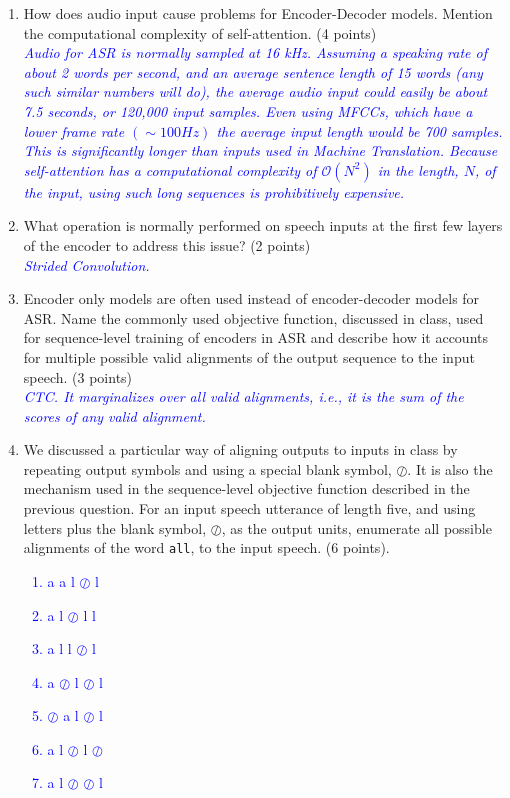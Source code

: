 \documentclass[12pt]{article}
\newcommand{\solution}[2]{\textcolor{blue}{\em #1}} %
\begin{document}
\begin{enumerate}

\item How does audio input cause problems for Encoder-Decoder models. Mention the computational complexity of self-attention.   \hfill (4 points)\\
\solution{Audio for ASR is normally sampled at 16 kHz. Assuming a speaking rate of about 2 words per second, and an average sentence length of 15 words (any such similar numbers will do), the average audio input could easily be about 7.5 seconds, or 120,000 input samples. Even using MFCCs, which have a lower frame rate $\left(\sim 100 Hz\right)$ the average input length would be 700 samples. This is significantly longer than inputs used in Machine Translation. Because self-attention has a computational complexity of $\mathcal{O}\left(N^2\right)$ in the length, $N$, of the input, using such long sequences is prohibitively expensive.}{\vspace{5cm}}

\item What operation is normally performed on speech inputs at the first few layers of the encoder to address this issue? \hfill (2 points)\\
\solution{Strided Convolution.}{\vspace{3cm}}


\item Encoder only models are often used instead of encoder-decoder models for ASR. Name the commonly used objective function, discussed in class, used for sequence-level training of encoders in ASR and describe how it accounts for multiple possible valid alignments of the output sequence to the input speech. \hfill (3 points)\\
\solution{CTC. It \emph{marginalizes} over all valid alignments, i.e., it is the sum of the scores of any valid alignment.}{\vspace{2cm}}

\newpage
\item We discussed a particular way of aligning outputs to inputs in class by repeating output symbols and using a special blank symbol, $\oslash$. It is also the mechanism used in the sequence-level objective function described in the previous question. For an input speech utterance of length five, and using letters plus the blank symbol, $\oslash$, as the output units, enumerate all possible alignments of the word \texttt{all}, to the input speech. \hfill (6 points). 
\solution{
\begin{enumerate}
    \item a a l $\oslash$ l
    \item a l $\oslash$ l l
    \item a l l $\oslash$ l 
    \item a $\oslash$ l $\oslash$ l
    \item $\oslash$ a l $\oslash$ l
    \item a l $\oslash$ l $\oslash$
    \item a l $\oslash$ $\oslash$ l
\end{enumerate}}{\vspace{2cm}}
\end{enumerate}
\end{document}
